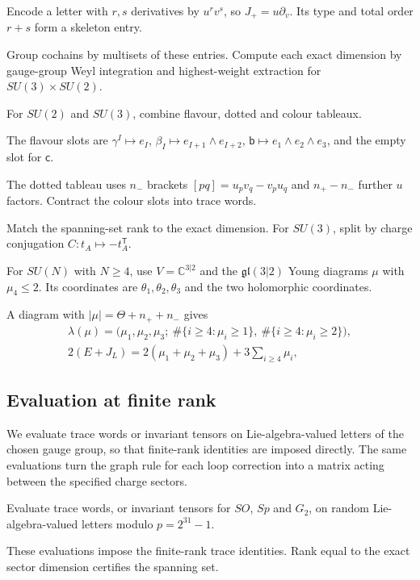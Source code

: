 \documentclass[11pt]{article}
\numberwithin{equation}{section}
\numberwithin{figure}{section}
\numberwithin{table}{section}
\begin{document}
Encode a letter with $r,s$ derivatives by $u^rv^s$, so $J_+=u\partial_v$. Its type and total order $r+s$ form a skeleton entry.

Group cochains by multisets of these entries. Compute each exact dimension by gauge-group Weyl integration and highest-weight extraction for $SU(3)\times SU(2)$.

For $SU(2)$ and $SU(3)$, combine flavour, dotted and colour tableaux.

The flavour slots are $\gamma^I\mapsto e_I$, $\beta_I\mapsto e_{I+1}\wedge e_{I+2}$, $\mathsf b\mapsto e_1\wedge e_2\wedge e_3$, and the empty slot for $\mathsf c$.

The dotted tableau uses $n_-$ brackets $[pq]=u_pv_q-v_pu_q$ and $n_+-n_-$ further $u$ factors. Contract the colour slots into trace words.

Match the spanning-set rank to the exact dimension. For $SU(3)$, split by charge conjugation $C:t_A\mapsto-t_A^{\mathsf T}$.

For $SU(N)$ with $N\ge4$, use $V=\mathbb C^{3|2}$ and the $\mathfrak{gl}(3|2)$ Young diagrams $\mu$ with $\mu_4\le2$. Its coordinates are $\theta_1,\theta_2,\theta_3$ and the two holomorphic coordinates.

A diagram with $|\mu|=\Theta+n_++n_-$ gives
\begin{equation}\label{eq-E-young}
\begin{gathered}\lambda(\mu)=\bigl(\mu_1,\mu_2,\mu_3;\ \#\{i\ge4:\mu_i\ge1\},\ \#\{i\ge4:\mu_i\ge2\}\bigr),\\ 2(E+J_L)=2(\mu_1+\mu_2+\mu_3)+3\sum_{i\ge4}\mu_i,\end{gathered}
\end{equation}

\subsection{Evaluation at finite rank}\label{sec-E-eval}

We evaluate trace words or invariant tensors on Lie-algebra-valued letters of the chosen gauge group, so that finite-rank identities are imposed directly. The same evaluations turn the graph rule for each loop correction into a matrix acting between the specified charge sectors.

Evaluate trace words, or invariant tensors for $SO$, $Sp$ and $G_2$, on random Lie-algebra-valued letters modulo $p=2^{31}-1$.

These evaluations impose the finite-rank trace identities. Rank equal to the exact sector dimension certifies the spanning set.
\end{document}

